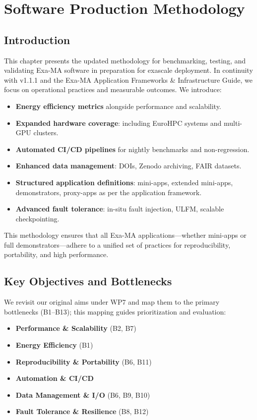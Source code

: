 
\chapter{Software Production Methodology}
\label{chap:methodology}

\section{Introduction}
This chapter presents the updated methodology for benchmarking, testing, and validating Exa-MA software in preparation for exascale deployment. In continuity with v1.1.1 and the Exa-MA Application Frameworks \& Infrastructure Guide, we focus on operational practices and measurable outcomes. We introduce:

\begin{itemize}
  \item \textbf{Energy efficiency metrics} alongside performance and scalability.
  \item \textbf{Expanded hardware coverage}: including EuroHPC systems and multi-GPU clusters.
  \item \textbf{Automated CI/CD pipelines} for nightly benchmarks and non-regression.
  \item \textbf{Enhanced data management}: DOIs, Zenodo archiving, FAIR datasets.
  \item \textbf{Structured application definitions}: mini-apps, extended mini-apps, demonstrators, proxy-apps as per the application framework.
  \item \textbf{Advanced fault tolerance}: in-situ fault injection, ULFM, scalable checkpointing.
\end{itemize}

This methodology ensures that all Exa-MA applications—whether mini-apps or full demonstrators—adhere to a unified set of practices for reproducibility, portability, and high performance.

\section{Key Objectives and Bottlenecks}
We revisit our original aims under WP7 and map them to the primary bottlenecks (B1--B13); this mapping guides prioritization and evaluation:

\begin{itemize}
  \item \textbf{Performance \& Scalability} (\ac{B2}, \ac{B7})
  \item \textbf{Energy Efficiency} (\ac{B1})
  \item \textbf{Reproducibility \& Portability} (\ac{B6}, \ac{B11})
  \item \textbf{Automation \& CI/CD}
  \item \textbf{Data Management \& I/O} (\ac{B6}, \ac{B9}, \ac{B10})
  \item \textbf{Fault Tolerance \& Resilience} (\ac{B8}, \ac{B12})
\end{itemize}

